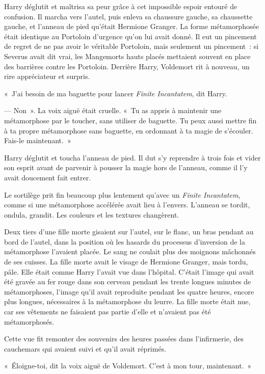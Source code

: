 Harry déglutit et maîtrisa sa peur grâce à cet impossible espoir entouré de confusion. Il marcha vers l'autel, puis enleva sa chaussure gauche, sa chaussette gauche, et l'anneau de pied qu'était Hermione Granger. La forme métamorphosée était identique au Portoloin d'urgence qu'on lui avait donné. Il eut un pincement de regret de ne pas avoir le véritable Portoloin, mais seulement un pincement~: si Severus avait dit vrai, les Mangemorts hauts placés mettaient souvent en place des barrières contre les Portoloin. Derrière Harry, Voldemort rit à nouveau, un rire appréciateur et surpris.

«~J'ai besoin de ma baguette pour lancer \emph{Finite Incantatem}, dit Harry.

--- Non~». La voix aiguë était cruelle. «~Tu as appris à maintenir une métamorphose par le toucher, sans utiliser de baguette. Tu peux aussi mettre fin à ta propre métamorphose sans baguette, en ordonnant à ta magie de s'écouler. Fais-le maintenant.~»

Harry déglutit et toucha l'anneau de pied. Il dut s'y reprendre à trois fois et vider son esprit avant de parvenir à pousser la magie hors de l'anneau, comme il l'y avait doucement fait entrer.

Le sortilège prit fin beaucoup plus lentement qu'avec un \emph{Finite Incantatem}, comme si une métamorphose accélérée avait lieu à l'envers. L'anneau se tordit, ondula, grandit. Les couleurs et les textures changèrent.

Deux tiers d'une fille morte gisaient sur l'autel, sur le flanc, un bras pendant au bord de l'autel, dans la position où les hasards du processus d'inversion de la métamorphose l'avaient placée. Le sang ne coulait plus des moignons mâchonnés de ses cuisses. La fille morte avait le visage de Hermione Granger, mais tordu, pâle. Elle était comme Harry l'avait vue dans l'hôpital. C'était l'image qui avait été gravée au fer rouge dans son cerveau pendant les trente longues minutes de métamorphoses, l'image qu'il avait reproduite pendant les quatre heures, encore plus longues, nécessaires à la métamorphose du leurre. La fille morte était nue, car ses vêtements ne faisaient pas partie d'elle et n'avaient pas été métamorphosés.

Cette vue fit remonter des souvenirs des heures passées dans l'infirmerie, des cauchemars qui avaient suivi et qu'il avait réprimés.

«~Éloigne-toi, dit la voix aiguë de Voldemort. C'est à mon tour, maintenant.~»

